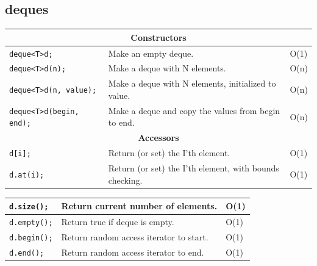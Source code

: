 \documentclass[12 pt, twoside] {article}
\begin{document}
{\subsection*{deques}
\begin{table}[h]
\centering
\begin{tabular}{|l|l|l|}
\hline
\multicolumn{3}{|c|}{\textbf{Constructors}}                                                                                      \\ \hline
\texttt{deque\textless T\textgreater d;}             & Make an empty deque.                                    & O(1)             \\ \hline
\texttt{deque\textless T\textgreater d(n);}          & Make a deque with N elements.                           & O(n)             \\ \hline
\texttt{deque\textless T\textgreater d(n, value);}   & Make a deque with N elements, initialized to value.     & O(n)             \\ \hline
\texttt{deque\textless T\textgreater d(begin, end);} & Make a deque and copy the values from begin to end.     & O(n)             \\ \hline
\multicolumn{3}{|c|}{\textbf{Accessors}}                                                                                         \\ \hline
\texttt{d{[}i{]}; }                                 & Return (or set) the I'th element.                       & O(1)             \\ \hline
\texttt{d.at(i);  }                                 & Return (or set) the I'th element, with bounds checking. & O(1)             \\ \hline
\end{tabular}
\end{table}
\newpage
\begin{table}
    \begin{tabular}{|l|l|l|}\hline
\texttt{d.size(); }                                 & Return current number of elements.                      & O(1)             \\ \hline
\texttt{d.empty();}                                 & Return true if deque is empty.                          & O(1)             \\ \hline
\texttt{d.begin();}                                 & Return random access iterator to start.                 & O(1)             \\ \hline
\texttt{d.end();  }                                 & Return random access iterator to end.                   & O(1)             \\ \hline

\end{tabular}
\end{table}}
\end{document}
